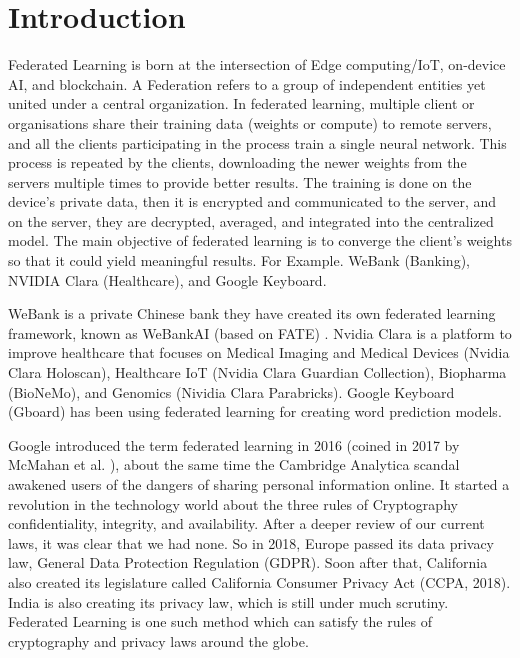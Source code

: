 \documentclass[conference]{IEEEtran}
\begin{document}
\section{Introduction}
Federated Learning is born at the intersection of Edge computing/IoT, on-device AI, and blockchain.  A Federation refers to a group of independent entities yet united under a central organization. In federated learning, multiple client or organisations share their training data (weights or compute) to remote servers, and all the clients participating in the process train a single neural network. This process is repeated by the clients, downloading the newer weights from the servers multiple times to provide better results. The training is done on the device's private data, then it is encrypted and communicated to the server, and on the server, they are decrypted, averaged, and integrated into
the centralized model. The main objective of federated learning is to converge the client's weights so that it could yield meaningful results. For Example. WeBank (Banking), NVIDIA Clara
(Healthcare), and Google Keyboard.\par
WeBank is a private Chinese bank they have created its own federated learning framework, known as WeBankAI (based on FATE) \cite{liu2021fate}. Nvidia Clara \cite{nvidia} is a platform to improve healthcare that focuses on \cite{liu2021fate} Medical Imaging and Medical Devices (Nvidia Clara Holoscan), Healthcare IoT (Nvidia Clara Guardian Collection), Biopharma (BioNeMo), and Genomics (Nividia Clara Parabricks). Google Keyboard (Gboard) \cite{yang2018applied} has been using federated learning for creating word prediction models.\par
Google introduced the term federated learning in 2016 (coined in 2017 by McMahan et al. \cite{mcmahan2017communication}), about the same time the Cambridge Analytica scandal awakened users of the dangers of sharing personal information online. It started a revolution in the technology world about the three rules of Cryptography confidentiality, integrity, and availability. After a deeper review of our current laws, it was clear that we had none. So in 2018, Europe passed its data privacy law, General Data Protection Regulation (GDPR). Soon after that, California also created its legislature called California Consumer Privacy Act (CCPA, 2018). India is also creating its privacy law, which is still under much scrutiny. Federated Learning is one such method which can satisfy the rules of cryptography and privacy laws around the globe.\par
\end{document}

